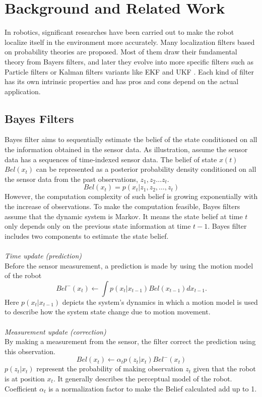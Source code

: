 \chapter{Background and Related Work\label{cha:chapter2}}

In robotics, significant researches have been carried out to make the robot localize itself in the environment more accurately. Many localization filters based on probability theories are proposed. Most of them draw their fundamental theory from Bayers filters, and later they evolve into more specific filters such as Particle filters \cite{dellaert1999monte} or Kalman filters \cite{kalman1960new} variants like \gls{EKF} \cite{julier1997new} and \gls{UKF} \cite{van2001square}. Each kind of filter has its own intrinsic properties and has pros and cons depend on the actual application.

\section{Bayes Filters}\label{sec:2.1}
Bayes filter aims to sequentially estimate the belief of the state conditioned on all the information obtained in the sensor data. As illustration, assume the sensor data has a sequences of time-indexed sensor data. The belief of state $x(t)$ $Bel(x_{t})$ can be represented as a posterior probability density conditioned on all the sensor data from the past observations, $z_{1},z_{2} \ldots z_{t}$.
$$Bel(x_{t}) = p(x_{t}|z_{1}, z_{2}, \ldots, z_{t})$$
However, the computation complexity of such belief is growing exponentially with the increase of observations. To make the computation feasible, Bayes filters assume that the dynamic system is Markov. It means the state belief at time $t$ only depends only on the previous state information at time $t-1$. Bayes filter includes two components to estimate the state belief.
\\
\\
\noindent \textit{Time update (prediction)}\\
Before the sensor measurement, a prediction is made by using the motion model of the robot
$$Bel^{-}(x_{t}) \leftarrow \int p(x_{t}|x_{t-1})Bel(x_{t-1})dx_{t-1}.$$
Here $p(x_{t}|x_{t-1})$ depicts the system's dynamics in which a motion model is used to describe how the system state change due to motion movement.
\\
\\
\noindent \textit{Measurement update (correction)}\\
By making a measurement from the sensor, the filter correct the prediction using this observation.
$$Bel(x_{t}) \leftarrow \alpha_{t}p(z_{t}|x_{t})Bel^{-}(x_{t})$$
$p(z_{t}|x_{t})$ represent the probability of making observation $z_{t}$ given that the robot is at position $x_{t}$. It generally describes the perceptual model of the robot. Coefficient $\alpha_{t}$ is a normalization factor to make the Belief calculated add up to 1.

